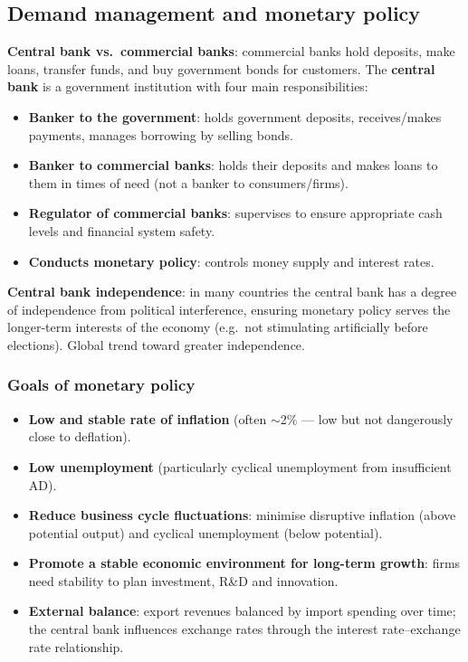 \documentclass[a4paper,12pt]{article}
\begin{document}
\subsection{Demand management and monetary policy}
\textbf{Central bank vs.\ commercial banks}: commercial banks hold deposits, make loans, transfer funds, and buy government bonds for customers. The \textbf{central bank} is a government institution with four main responsibilities:
\begin{itemize}
  \item \textbf{Banker to the government}: holds government deposits, receives/makes payments, manages borrowing by selling bonds.
  \item \textbf{Banker to commercial banks}: holds their deposits and makes loans to them in times of need (not a banker to consumers/firms).
  \item \textbf{Regulator of commercial banks}: supervises to ensure appropriate cash levels and financial system safety.
  \item \textbf{Conducts monetary policy}: controls money supply and interest rates.
\end{itemize}
\textbf{Central bank independence}: in many countries the central bank has a degree of independence from political interference, ensuring monetary policy serves the longer-term interests of the economy (e.g.\ not stimulating artificially before elections). Global trend toward greater independence.

\subsubsection*{Goals of monetary policy}
\begin{itemize}
  \item \textbf{Low and stable rate of inflation} (often $\sim$2\% --- low but not dangerously close to deflation).
  \item \textbf{Low unemployment} (particularly cyclical unemployment from insufficient AD).
  \item \textbf{Reduce business cycle fluctuations}: minimise disruptive inflation (above potential output) and cyclical unemployment (below potential).
  \item \textbf{Promote a stable economic environment for long-term growth}: firms need stability to plan investment, R\&D and innovation.
  \item \textbf{External balance}: export revenues balanced by import spending over time; the central bank influences exchange rates through the interest rate--exchange rate relationship.
\end{itemize}
\end{document}
